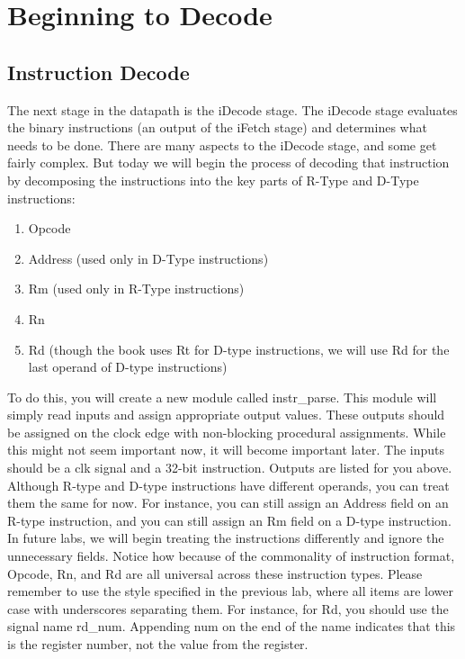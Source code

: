 \chapter{Beginning to Decode}

\section{Instruction Decode}

The next stage in the datapath is the iDecode stage.  The iDecode stage evaluates the binary instructions (an output of the iFetch stage) and determines what needs to be done.  There are many aspects to the iDecode stage, and some get fairly complex.  But today we will begin the process of decoding that instruction by decomposing the instructions into the key parts of R-Type and D-Type instructions:
\begin{enumerate}
	\item Opcode
	\item Address (used only in D-Type instructions)
	\item Rm (used only in R-Type instructions)
	\item Rn
	\item Rd (though the book uses Rt for D-type instructions, we will use Rd for the last operand of D-type instructions)
\end{enumerate}   

To do this, you will create a new module called instr\_parse.  This module will simply read inputs and assign appropriate output values.  These outputs should be assigned on the clock edge with non-blocking procedural assignments.  While this might not seem important now, it will become important later.  The inputs should be a clk signal and a 32-bit instruction.  Outputs are listed for you above.  Although R-type and D-type instructions have different operands, you can treat them the same for now.  For instance, you can still assign an Address field on an R-type instruction, and you can still assign an Rm field on a D-type instruction.  In future labs, we will begin treating the instructions differently and ignore the unnecessary fields.  Notice how because of the commonality of instruction format, Opcode, Rn, and Rd are all universal across these instruction types.  Please remember to use the style specified in the previous lab, where all items are lower case with underscores separating them.  For instance, for Rd, you should use the signal name rd\_num.  Appending num on the end of the name indicates that this is the register number, not the value from the register.

